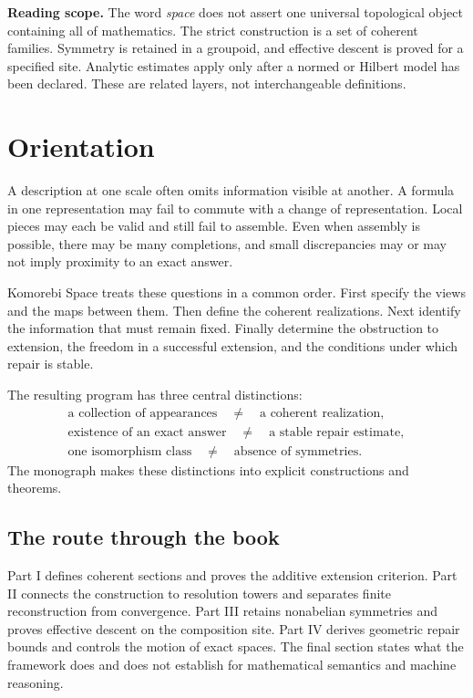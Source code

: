 \documentclass[11pt]{article}
\begin{document}
\begin{scopebox}
\textbf{Reading scope.} The word \emph{space} does not assert one universal topological object containing all of mathematics. The strict construction is a set of coherent families. Symmetry is retained in a groupoid, and effective descent is proved for a specified site. Analytic estimates apply only after a normed or Hilbert model has been declared. These are related layers, not interchangeable definitions.
\end{scopebox}

\clearpage
\section*{Orientation}
A description at one scale often omits information visible at another. A formula in one representation may fail to commute with a change of representation. Local pieces may each be valid and still fail to assemble. Even when assembly is possible, there may be many completions, and small discrepancies may or may not imply proximity to an exact answer.

Komorebi Space treats these questions in a common order. First specify the views and the maps between them. Then define the coherent realizations. Next identify the information that must remain fixed. Finally determine the obstruction to extension, the freedom in a successful extension, and the conditions under which repair is stable.

The resulting program has three central distinctions:
\[
\begin{gathered}
\text{a collection of appearances}\quad\ne\quad\text{a coherent realization},\\
\text{existence of an exact answer}\quad\ne\quad\text{a stable repair estimate},\\
\text{one isomorphism class}\quad\ne\quad\text{absence of symmetries}.
\end{gathered}
\]
The monograph makes these distinctions into explicit constructions and theorems.

\subsection*{The route through the book}
Part I defines coherent sections and proves the additive extension criterion. Part II connects the construction to resolution towers and separates finite reconstruction from convergence. Part III retains nonabelian symmetries and proves effective descent on the composition site. Part IV derives geometric repair bounds and controls the motion of exact spaces. The final section states what the framework does and does not establish for mathematical semantics and machine reasoning.
\end{document}

